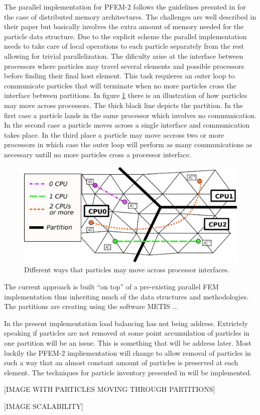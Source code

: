 The parallel implementation for PFEM-2 follows the guidelines presnted in \cite{gimenez:parallel} for the case of distributed memory architectures. The challenges are well described in their paper but basically involves the extra amount of memory needed for the particle data structure. Due to the explicit scheme the parallel implementation needs to take care of local operations to each particle separately from the rest allowing for trivial parallelization. The dificulty arise at the interface between processors where particles may travel several elements and possible processors before finding their final host element. This task requieres an outer loop to communicate particles that will terminate when no more particles cross the interface between partitions. In figure \ref{fig:parallel} there is an illustration of how particles may move across processors. The thick black line depicts the partition. In the first case a particle lands in the same processor which involves no communication. In the second case a particle moves across a single interface and communication takes place. In the third place a particle may move accross two or more processors in which case the outer loop will perform as many communications as necessary untill no more particles cross a processor interface.

\begin{figure}[htp] 
\centering 
\includegraphics[scale=.4]{./imgs/parallel.eps}
\caption{Different ways that particles may move across processor interfaces.}
\label{fig:parallel}
\end{figure}


The current approach is built ``on top'' of a pre-existing parallel FEM implementation thus inheriting much of the data structures and methodologies. The partitions are creating using the software METIS \cite{metis1,metis}...

In the present implementation load balancing has not being address. Extrictely speaking if particles are not removed at some point accumulation of particles in one partition will be an issue. This is something that will be address later. Most luckily the PFEM-2 impliementation will change to allow removal of particles in such a way that an almost constant amount of particles is preserved at each element. The techniques for particle inventory presented in \cite{gimenez-difusion} will be implemented.



[IMAGE WITH PARTICLES MOVING THROUGH PARTITIONS]



[IMAGE SCALABILITY]


 
